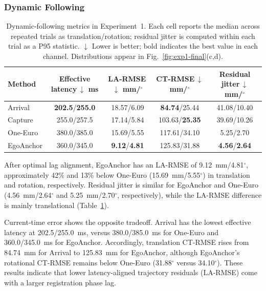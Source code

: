 \documentclass[review]{vgtc}
\begin{document}
\subsubsection{Dynamic Following}

\begin{table}[t]
\centering
\caption{Dynamic-following metrics in Experiment~1. Each cell reports the median across repeated trials as translation/rotation; residual jitter is computed within each trial as a P95 statistic. $\downarrow$ Lower is better; bold indicates the best value in each channel. Distributions appear in Fig.~\ref{fig:exp1-final}(c,d).}
\label{tab:exp1-dynamic}
\setlength{\tabcolsep}{2pt}
\begin{tabular}{@{}lcccc@{}}
\toprule
Method & \shortstack{Effective\\latency\,$\downarrow$\\ms} & \shortstack{LA-RMSE\,$\downarrow$\\mm/$^\circ$} & \shortstack{CT-RMSE\,$\downarrow$\\mm/$^\circ$} & \shortstack{Residual\\jitter\,$\downarrow$\\mm/$^\circ$} \\
\midrule
Arrival   & \textbf{202.5}/\textbf{255.0} & 18.57/6.09 & \textbf{84.74}/25.44 & 41.08/10.40 \\
Capture   & 255.0/257.5 & 17.14/5.84 & 103.63/\textbf{25.35} & 39.69/10.26 \\
One-Euro  & 380.0/385.0 & 15.69/5.55 & 117.61/34.10 & 5.25/2.70 \\
EgoAnchor & 360.0/345.0 & \textbf{9.12}/\textbf{4.81} & 125.83/31.88 & \textbf{4.56}/\textbf{2.64} \\
\bottomrule
\end{tabular}
\end{table}

After optimal lag alignment, EgoAnchor has an LA-RMSE of 9.12~mm/4.81$^\circ$, approximately 42\% and 13\% below One-Euro (15.69~mm/5.55$^\circ$) in translation and rotation, respectively. Residual jitter is similar for EgoAnchor and One-Euro (4.56~mm/2.64$^\circ$ and 5.25~mm/2.70$^\circ$, respectively), while the LA-RMSE difference is mainly translational (Table~\ref{tab:exp1-dynamic}).

Current-time error shows the opposite tradeoff. Arrival has the lowest effective latency at 202.5/255.0~ms, versus 380.0/385.0~ms for One-Euro and 360.0/345.0~ms for EgoAnchor. Accordingly, translation CT-RMSE rises from 84.74~mm for Arrival to 125.83~mm for EgoAnchor, although EgoAnchor's rotational CT-RMSE remains below One-Euro (31.88$^\circ$ versus 34.10$^\circ$). These results indicate that lower latency-aligned trajectory residuals (LA-RMSE) come with a larger registration phase lag.
\end{document}
